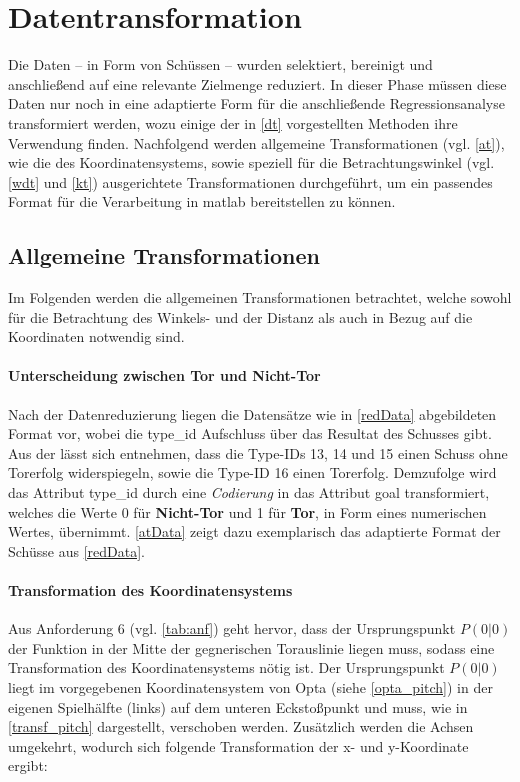 \section{Datentransformation}
\label{dt}
Die Daten -- in Form von Schüssen -- wurden selektiert, bereinigt und anschließend auf eine relevante Zielmenge reduziert. In dieser Phase müssen diese Daten nur noch in eine adaptierte Form für die anschließende Regressionsanalyse transformiert werden, wozu einige der in \vref{dt} vorgestellten Methoden ihre Verwendung finden. Nachfolgend werden allgemeine Transformationen (vgl. \vref{at}), wie die des Koordinatensystems, sowie speziell für die Betrachtungswinkel (vgl. \vref{wdt} und \vref{kt}) ausgerichtete Transformationen durchgeführt, um ein passendes Format für die Verarbeitung in \gls{matlab} bereitstellen zu können.


\subsection{Allgemeine Transformationen}
\label{at}
Im Folgenden werden die allgemeinen Transformationen betrachtet, welche sowohl für die Betrachtung des Winkels- und der Distanz als auch in Bezug auf die Koordinaten notwendig sind.

\paragraph{Unterscheidung zwischen Tor und Nicht-Tor} Nach der Datenreduzierung liegen die Datensätze wie in \vref{redData} abgebildeten Format vor, wobei die \textsf{type\_id} Aufschluss über das Resultat des Schusses gibt. Aus der  lässt sich entnehmen, dass die Type-IDs \textsf{13, 14} und \textsf{15} einen Schuss ohne Torerfolg widerspiegeln, sowie die Type-ID \textsf{16} einen Torerfolg. Demzufolge wird das Attribut \textsf{type\_id} durch eine \textit{Codierung} in das Attribut \textsf{goal} transformiert, welches die Werte \textsf{0} für \textbf{Nicht-Tor} und \textsf{1} für \textbf{Tor}, in Form eines numerischen Wertes, übernimmt. \vref{atData} zeigt dazu exemplarisch das adaptierte Format der Schüsse aus \vref{redData}.

\paragraph{Transformation des Koordinatensystems}
Aus Anforderung 6 (vgl. \vref{tab:anf}) geht hervor, dass der Ursprungspunkt $P(0|0)$ der Funktion in der Mitte der gegnerischen Torauslinie liegen muss, sodass eine Transformation des Koordinatensystems nötig ist. Der Ursprungspunkt $P(0|0)$ liegt im  vorgegebenen Koordinatensystem von Opta (siehe \vref{opta_pitch}) in der eigenen Spielhälfte (links) auf dem unteren Eckstoßpunkt und muss, wie in \vref{transf_pitch} dargestellt, verschoben werden. Zusätzlich werden die Achsen umgekehrt, wodurch sich folgende Transformation der x- und y-Koordinate ergibt:\enlargethispage{\baselineskip}\newline

